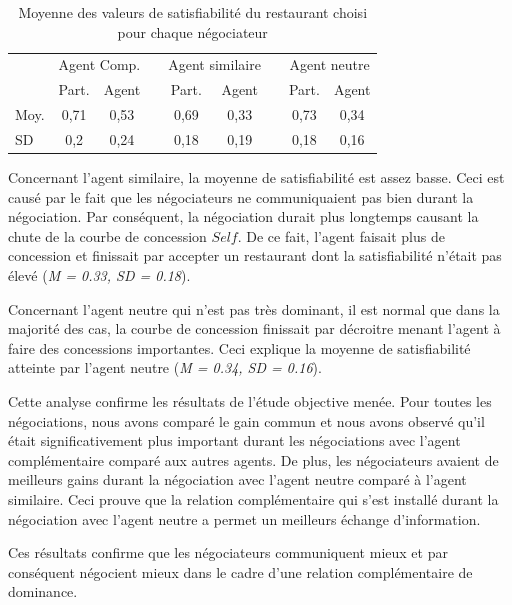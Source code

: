 	
	\begin{table}
		\centering
		\caption{Moyenne des valeurs de satisfiabilité du restaurant choisi pour chaque négociateur} 
		\begin{tabular} {lcccccccc}
			\hline
			\hline
			& \multicolumn{2}{c}{Agent Comp.} & & \multicolumn{2}{c}{Agent similaire}& & \multicolumn{2}{c}{Agent neutre} \\ %
			\cline{2-3} \cline{5-6} \cline{8-9} %
			& Part. & Agent & & Part. & Agent & &  Part. &Agent \\ \hline
			Moy. &0,71 & 0,53 & &  0,69 & 0,33 & & 0,73 & 0,34 \\
			SD & 0,2 & 0,24 & &  0,18 & 0,19 & & 0,18 & 0,16 \\
			\hline
			\hline
		\end{tabular}
		\label{tab:gainPerceptif}
		
	\end{table}
	
	Concernant l'agent similaire, la moyenne de satisfiabilité est assez basse. Ceci est causé par le fait que les négociateurs ne communiquaient pas bien durant la négociation. Par conséquent, la négociation durait plus longtemps causant la chute de la courbe de concession $Self$. De ce fait, l'agent faisait plus de concession et finissait par accepter un restaurant dont la satisfiabilité n'était pas élevé (\emph{M = 0.33, SD = 0.18}).
	
	Concernant l'agent neutre qui n'est pas très dominant, il est normal que dans la majorité des cas, la courbe de concession finissait par décroitre menant l'agent à faire des concessions importantes. Ceci explique la moyenne de satisfiabilité atteinte par l'agent neutre  (\emph{M = 0.34, SD = 0.16}).
	
	Cette analyse confirme les résultats de l'étude objective menée.
	Pour toutes les négociations, nous avons comparé le gain commun et nous avons observé qu'il était significativement plus important durant les négociations avec l'agent complémentaire comparé aux autres agents. De plus, les négociateurs avaient de meilleurs gains durant la négociation avec l'agent neutre comparé à l'agent similaire. Ceci prouve que la relation complémentaire qui s'est installé durant la négociation avec l'agent neutre a permet un meilleurs échange d'information. 
	
	Ces résultats confirme que les négociateurs communiquent mieux et par conséquent négocient mieux dans le cadre d'une relation complémentaire de dominance.  
	
